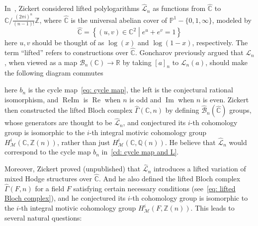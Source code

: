 In~\cite{Zickert_HolomorphicPolylogarithmsAndBlochComplexes}, Zickert considered lifted polylogarithms $\widehat{\mathcal L}_n$ as functions from $\widehat{\mathbb C}$ to $\mathbb C/\frac{(2\pi i)^n}{(n-1)!}\mathbb Z$, where $\widehat{\mathbb C}$ is the universal abelian cover of $\mathbb P^1-\{0,1,\infty\}$, modeled by
\begin{equation}\label{eq: CHat}
\widehat{\mathbb C}=\left\{(u,v)\in\mathbb C^2\middle|e^u+e^v=1\right\}
\end{equation}
here $u,v$ should be thought of as $\log(x)$ and $\log(1-x)$, respectively. The term ``lifted'' refers to constructions over $\widehat{\mathbb C}$. Goncharov previously argued that $\mathcal L_n$, when viewed as a map $\mathcal B_n(\mathbb C)\to\mathbb R$ by taking $[a]_n$ to $\mathcal L_n(a)$, should make the following diagram commutes
\begin{center}
\end{center}
here $b_n$ is the cycle map~\eqref{eq: cycle map}, the left is the conjectural rational isomorphism, and $\operatorname{ReIm}$ is $\operatorname{Re}$ when $n$ is odd and $\operatorname{Im}$ when $n$ is even. Zickert then constructed the lifted Bloch complex $\widehat\Gamma(\mathbb C,n)$ by defining $\widehat{\mathcal B}_n(\widehat{\mathbb C})$ groups, whose generators are thought to be $\widehat{\mathcal L}_n$, and conjectured its $i$-th cohomology group is isomorphic to the $i$-th integral motivic cohomology group $H^i_{\mathcal M}(\mathbb C,\mathbb Z(n))$, rather than just $H^i_{\mathcal M}(\mathbb C,\mathbb Q(n))$. He believe that $\widehat{\mathcal L}_n$ would correspond to the cycle map $b_n$ in~\eqref{cd: cycle map and L}.

Moreover, Zickert proved (unpublished) that $\widehat{\mathcal L}_n$ introduces a lifted variation of mixed Hodge structures over $\widehat{\mathbb C}$. And he also defined the lifted Bloch complex $\widehat\Gamma(F,n)$ for a field $F$ satisfying certain necessary conditions (see~\ref{eq: lifted Bloch complex}), and he conjectured its $i$-th cohomology group is isomorphic to the $i$-th integral motivic cohomology group $H^i_{\mathcal M}(F,\mathbb Z(n))$. This leads to several natural questions:

